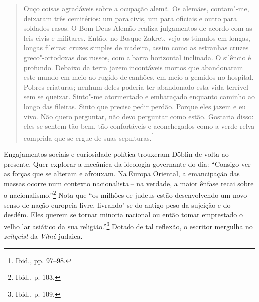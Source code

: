 \begin{quote}
Ouço coisas agradáveis sobre a ocupação alemã. Os alemães, contam"-me,
deixaram três cemitérios: um para civis, um para oficiais e outro para
soldados rasos. O Bom Deus Alemão realiza julgamentos de acordo com as
leis civis e militares. Então, no Bosque Zakret, vejo os túmulos em
longas, longas fileiras: cruzes simples de madeira, assim como as
estranhas cruzes greco"-ortodoxas dos russos, com a barra horizontal
inclinada. O silêncio é profundo. Debaixo da terra jazem incontáveis
mortos que abandonaram este mundo em meio ao rugido de canhões, em meio
a gemidos no hospital. Pobres criaturas; nenhum deles poderia ter
abandonado esta vida terrível sem se queixar. Sinto"-me atormentado e
embaraçado enquanto caminho ao longo das fileiras. Sinto que preciso
pedir perdão. Porque eles jazem e eu vivo. Não quero perguntar, não devo
perguntar como estão. Gostaria disso: eles se sentem tão bem, tão
confortáveis e aconchegados como a verde relva comprida que se ergue de
suas sepulturas.\footnote{Ibid., pp. 97--98.}
\end{quote}


Engajamentos sociais e curiosidade política trouxeram Döblin de volta ao
presente. Quer explorar a mecânica da ideologia governante do dia:
``Consigo ver as forças que se alteram e afrouxam. Na Europa Oriental, a
emancipação das massas ocorre num contexto nacionalista -- na verdade, a
maior ênfase recai sobre o nacionalismo.''\footnote{Ibid., p. 103.} Nota
que ``os milhões de judeus estão desenvolvendo um novo senso de nação
europeia livre, livrando"-se do antigo peso da sujeição e do desdém. Eles
querem se tornar minoria nacional ou então tomar emprestado o velho lar
asiático da sua religião.''\footnote{Ibid., p. 109.} Dotado de tal
reflexão, o escritor mergulha no \textit{zeitgeist} da \textit{Vilnè} judaica.


